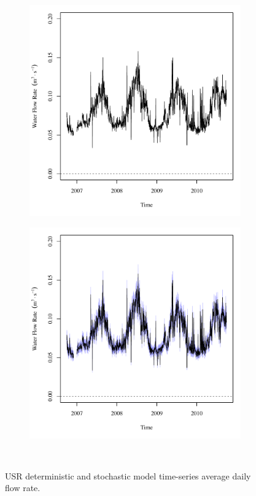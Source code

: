 \begin{linenumbers}
\begin{landscape}
\begin{figure}
\begin{subfigure}{0.7\textwidth}
			\includegraphics[width=\tableCustomSize]{"Figures/Results_USR/Deterministic/Q WTP"}
		\end{subfigure}%
		\begin{subfigure}{0.7\textwidth}
			\centering
			\includegraphics[width=\tableCustomSize]{"Figures/Results_USR/Stochastic/Q WTP"}
		\end{subfigure}\\
		\caption{USR deterministic and stochastic model time-series average daily flow rate.}
	\end{figure}
\end{landscape}




\end{linenumbers}
